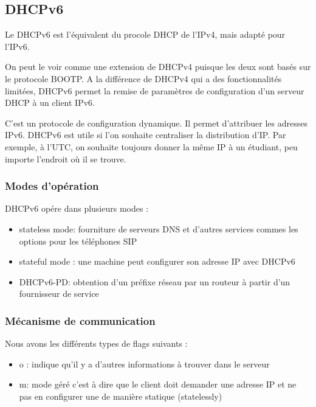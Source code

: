 \subsection{DHCPv6}

Le DHCPv6 est l’équivalent du procole DHCP de l'IPv4, mais adapté pour l'IPv6.

On peut le voir comme une extension de DHCPv4 puisque les deux sont basés sur le protocole BOOTP. A la différence de DHCPv4 qui a des fonctionnalités limitées, DHCPv6 permet la remise de paramètres de configuration d’un serveur DHCP à un client IPv6. 

C’est un protocole de configuration dynamique.
Il permet d’attribuer les adresses IPv6. 
DHCPv6 est utile si l’on souhaite centraliser la distribution d’IP. 
Par exemple, à l’UTC, on souhaite toujours donner la même IP à un étudiant, peu importe l’endroit où il se trouve. 

\subsubsection{Modes d’opération}

DHCPv6 opére dans plusieurs modes :
\begin{itemize}
  \item stateless mode: fourniture de serveurs DNS et d’autres services commes les options pour les téléphones SIP
  \item stateful mode : une machine peut configurer son adresse IP avec DHCPv6
  \item DHCPv6-PD: obtention d’un préfixe réseau par un routeur à partir d’un fournisseur de service
\end{itemize}

\subsubsection{Mécanisme de communication}


Nous avons les différents types de flags suivants : 
\begin{itemize}
  \item o : indique qu’il y a d’autres informations à trouver dans le serveur 
  \item m: mode géré c’est à dire que le client doit demander une adresse IP et ne pas en configurer une de manière statique (statelessly)
\end{itemize}

